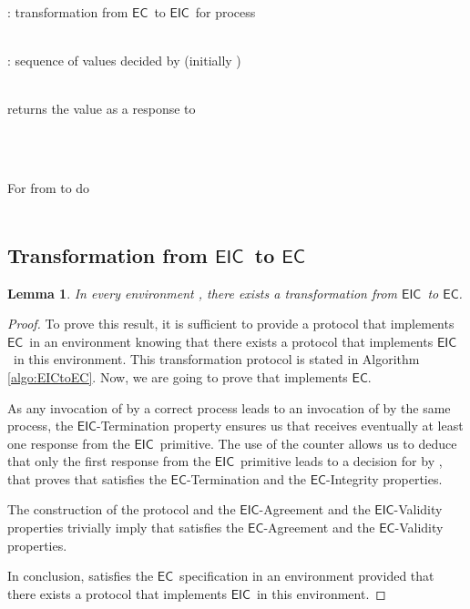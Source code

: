 \documentclass[11pt]{article}
\newtheorem{lemma}{Lemma}
\newcommand{\EC}{\ensuremath{\mathsf{EC}}}
\newcommand{\EIC}{\ensuremath{\mathsf{EIC}}}
\begin{document}
\begin{algorithm}
\caption{: transformation from \EC~to \EIC~for process }\label{algo:ECtoEIC}
\small
\begin{description}\itemsep0pt
\item[Internal variables:]~\\
: sequence of values decided by  (initially )

\item[Functions:]~\\
 returns the value  as a response to 

\item[On invocation of ]~\\


\item[On reception of  as response of ]~\\
For  from  to  do\\
\\


\end{description}
\normalsize
\end{algorithm}

\subsection{Transformation from \EIC~to \EC}

\begin{lemma}\label{lem:EICtoEC}
In every environment , there exists a transformation from \EIC~to \EC.
\end{lemma}

\begin{proof}
To prove this result, it is sufficient to provide a protocol that implements \EC~in an environment  knowing that there exists a protocol that implements \EIC~in this environment. This transformation protocol  is stated in Algorithm \ref{algo:EICtoEC}. Now, we are going to prove that  implements \EC.

As any invocation of  by a correct process  leads to an invocation of  by the same process, the \EIC-Termination property ensures us that  receives eventually at least one response from the \EIC~primitive. The use of the counter  allows us to deduce that only the first response from the \EIC~primitive leads to a decision for  by , that proves that  satisfies the \EC-Termination and the \EC-Integrity properties.

The construction of the protocol and the \EIC-Agreement and the \EIC-Validity properties trivially imply that  satisfies the \EC-Agreement and the \EC-Validity properties.

In conclusion,  satisfies the \EC~specification in an environment  provided that there exists a protocol that implements \EIC~in this environment.
\end{proof}
\end{document}
